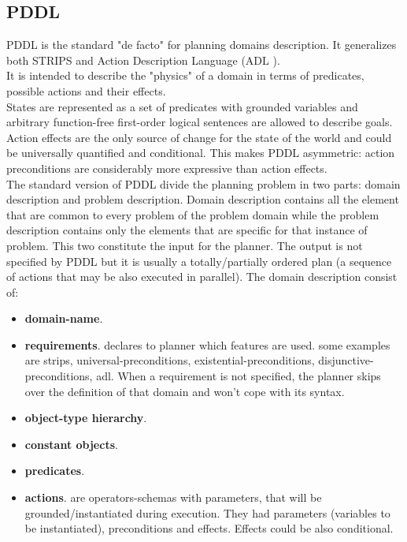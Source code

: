 \documentclass[pdftex,12pt,a4paper]{report}
\begin{document}
\subsection{PDDL}\label{pddl}
\noindent PDDL \cite{mcdermott1998pddl} %
is the standard "de facto" for planning domains description. It generalizes both STRIPS\cite{fikes1971strips} %
and Action Description Language (ADL \cite{pednault1987formulating}).%
\\\noindent It is intended to describe the "physics" of a domain in terms of predicates, possible actions and their effects.
\\\noindent States are represented as a set of predicates with grounded variables and arbitrary function-free first-order logical sentences are allowed to describe goals. 
Action effects are the only source of change for the state of the world and could be universally quantified and conditional. This makes PDDL asymmetric: action preconditions are considerably more expressive than action effects.
\\\noindent The standard version of PDDL divide the planning problem in two parts: domain description and problem description. Domain description contains all the element that are common to every problem of the problem domain while the problem description contains only the elements that are specific for that instance of problem. This two constitute the input for the planner. The output is not specified by PDDL but it is usually a totally/partially ordered plan (a sequence of actions that may be also executed in parallel).
The domain description consist of:
\begin{itemize}
\item \textbf{domain-name}. 
\item \textbf{requirements}. declares to planner which features are used. some examples are strips, universal-preconditions, existential-preconditions, disjunctive-preconditions, adl. When a requirement is not specified, the planner skips over the definition of that domain and won't cope with its syntax.
\item \textbf{object-type hierarchy}.
\item \textbf{constant objects}.
\item \textbf{predicates}.
\item \textbf{actions}. are operators-schemas with parameters, that will be grounded/instantiated during execution. They had parameters (variables to be instantiated), preconditions and effects. Effects could be also conditional. 
\end{itemize}
\end{document}
